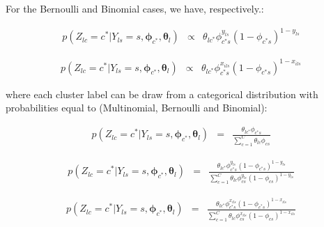 \documentclass[article]{jss}
\begin{document}
For the Bernoulli and Binomial cases, we have, respectively.:

\begin{equation*}
\begin{array}{lll}
p(Z_{lc}=c^{*}|Y_{ls}=s,\boldsymbol\phi_{c^{*}},\boldsymbol\theta_{l})&\propto&\theta_{lc^{*}}\phi_{c^{*}s}^{y_{ls}}(1-\phi_{c^{*}s})^{1-y_{ls}}
\end{array}
\label{ap:eq0003} 
\end{equation*}

\begin{equation*}
\begin{array}{lll}
p(Z_{lc}=c^{*}|Y_{ls}=s,\boldsymbol\phi_{c^{*}},\boldsymbol\theta_{l})&\propto&\theta_{lc^{*}}\phi_{c^{*}s}^{x_{ils}}(1-\phi_{c^{*}s})^{1-x_{ils}}
\end{array}
\label{ap:eq0004} 
\end{equation*}

\noindent where each cluster label can be draw from a categorical
distribution with probabilities equal to (Multinomial, Bernoulli and
Binomial):

\begin{equation*}
\begin{array}{lll}
p(Z_{lc}=c^{*}|Y_{ls}=s,\boldsymbol\phi_{c^{*}},\boldsymbol\theta_{l})&=&\frac{\theta_{lc^{*}}\phi_{c^{*}s}}{\displaystyle\sum_{c=1}^{C}\theta_{lc}\phi_{cs}}
\end{array}
\label{ap:eq0005} 
\end{equation*}

\begin{equation*}
\begin{array}{lll}
p(Z_{lc}=c^{*}|Y_{ls}=s,\boldsymbol\phi_{c^{*}},\boldsymbol\theta_{l})&=&\frac{\theta_{lc^{*}}\phi_{c^{*}s}^{y_{ls}}(1-\phi_{c^{*}s})^{1-y_{ls}}}{\displaystyle\sum_{c=1}^{C}\theta_{lc}\phi_{cs}^{y_{ls}}(1-\phi_{cs})^{1-y_{ls}}}
\end{array}
\label{ap:eq0006} 
\end{equation*}

\begin{equation*}
\begin{array}{lll}
p(Z_{lc}=c^{*}|Y_{ls}=s,\boldsymbol\phi_{c^{*}},\boldsymbol\theta_{l})&=&\frac{\theta_{lc^{*}}\phi_{c^{*}s}^{x_{ils}}(1-\phi_{c^{*}s})^{1-x_{ils}}}{\displaystyle\sum_{c=1}^{C}\theta_{lc}\phi_{cs}^{x_{ils}}(1-\phi_{cs})^{1-x_{ils}}}
\end{array}
\label{ap:eq0007} 
\end{equation*}
\end{document}

